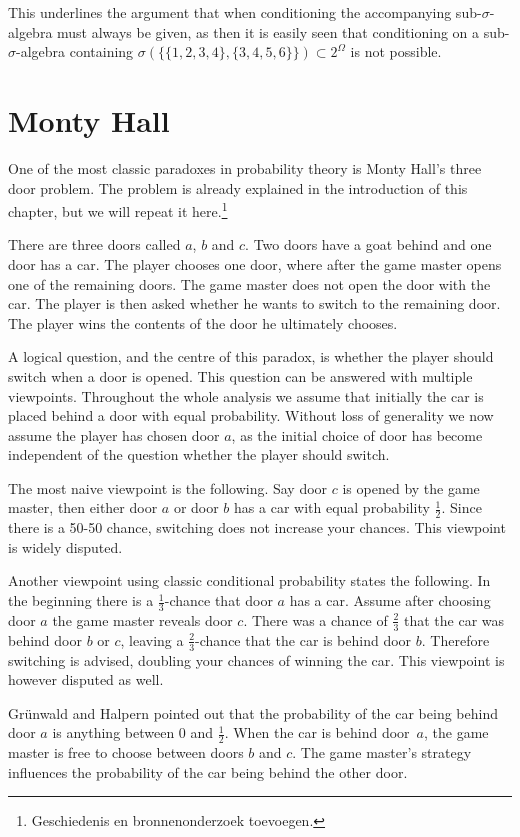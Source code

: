 \documentclass[a4paper]{report}
\theoremstyle{plain}
\theoremstyle{definition}
\theoremstyle{remark}
\numberwithin{equation}{chapter}
\DeclareMathOperator{\1}{\mathbbm{1}}
\begin{document}
This underlines the argument that when conditioning the accompanying sub-$\sigma$-algebra must always be given, as then it is easily seen that conditioning on a sub-$\sigma$-algebra containing $\sigma(\{\{1,2,3,4\},\{3,4,5,6\}\})\subset2^\Omega$ is not possible.

\section{Monty Hall}\label{sec:DiscMonty}
One of the most classic paradoxes in probability theory is Monty Hall's three door problem. The problem is already explained in the introduction of this chapter, but we will repeat it here.\footnote{Geschiedenis en bronnenonderzoek toevoegen.}

There are three doors called $a$, $b$ and $c$.  Two doors have a goat behind and one door has a car. The player chooses one door, where after the game master opens one of the remaining doors. The game master does not open the door with the car. The player is then asked whether he wants to switch to the remaining door. The player wins the contents of the door he ultimately chooses.

A logical question, and the centre of this paradox, is whether the player should switch when a door is opened. This question can be answered with multiple viewpoints. Throughout the whole analysis we assume that initially the car is placed behind a door with equal probability. Without loss of generality we now assume the player has chosen door $a$, as the initial choice of door has become independent of the question whether the player should switch.

The most naive viewpoint is the following. Say door $c$ is opened by the game master, then either door $a$ or door $b$ has a car with equal probability $\frac{1}{2}$. Since there is a 50-50 chance, switching does not increase your chances. This viewpoint is widely disputed.

Another viewpoint using classic conditional probability states the following. In the beginning there is a $\frac{1}{3}$-chance that door $a$ has a car. Assume after choosing door $a$ the game master reveals door $c$. There was a chance of $\frac{2}{3}$ that the car was behind door $b$ or $c$, leaving a $\frac{2}{3}$-chance that the car is behind door $b$. Therefore switching is advised, doubling your chances of winning the car. This viewpoint is however disputed as well.

Grünwald and Halpern \cite{Grunwald03} pointed out that the probability of the car being behind door $a$ is anything between $0$ and $\frac{1}{2}$. When the car is behind door~$a$, the game master is free to choose between doors $b$ and $c$. The game master's strategy influences the probability of the car being behind the other door.
\end{document}
